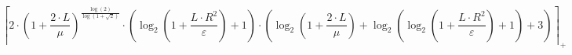 \[\left\lceil 2 \cdot \left(1 + \frac{2 \cdot L}{\mu}\right)^{\frac{\log\left(2\right)}{\log\left(1 + \sqrt{2}\right)}} \cdot \left(\log_{2}\left(1 + \frac{L \cdot R^{2}}{\varepsilon}\right) + 1\right) \cdot \left(\log_{2}\left(1 + \frac{2 \cdot L}{\mu}\right) + \log_{2}\left(\log_{2}\left(1 + \frac{L \cdot R^{2}}{\varepsilon}\right) + 1\right) + 3\right) \right\rceil_{+}\]
